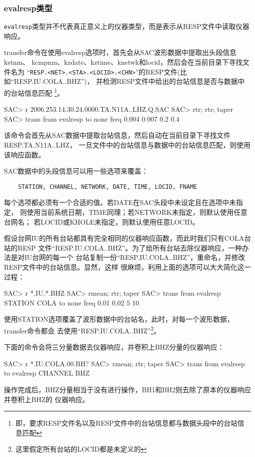 \subsubsection{evalresp类型}
\verb+evalresp+类型并不代表真正意义上的仪器类型，而是表示从RESP文件中读取仪器
响应。

transfer命令在使用evalresp选项时，首先会从SAC波形数据中提取出头段信息kstnm、
kcmpnm、kzdate、kztime、knetwk和locid，然后会在当前目录下寻找文件名为
``\verb+RESP.<NET>.<STA>.<LOCID>.<CHN>+''的RESP文件(比如``RESP.IU.COLA..BHZ'')，
并检测RESP文件中给出的台站信息是否与数据中的台站信息匹配
\footnote{即，要求RESP文件名以及RESP文件中的台站信息都与数据头段中的台站信息匹配}。
\begin{SACCode}
SAC> r 2006.253.14.30.24.0000.TA.N11A..LHZ.Q.SAC
SAC> rtr; rtr; taper
SAC> trans from evalresp to none freq 0.004 0.007 0.2 0.4
\end{SACCode}
该命令会首先从SAC数据中提取台站信息，然后自动在当前目录下寻找文件RESP.TA.N11A..LHZ，
一旦文件中的台站信息与数据中的台站信息匹配，则使用该响应函数。

SAC数据中的头段信息可以用一些选项来覆盖：
\begin{verbatim}
    STATION, CHANNEL, NETWORK, DATE, TIME, LOCID, FNAME
\end{verbatim}
每个选项都必须有一个合适的值。若DATE在SAC头段中未设定且在选项中未指定，
则使用当前系统日期，TIME同理；若NETWORK未指定，则默认使用任意台网名；
若LOCID或KHOLE未指定，则默认使用任意LOCID。

假设台网IU的所有台站都具有完全相同的仪器响应函数，而此时我们只有COLA台站的RESP
文件``RESP.IU.COLA..BHZ''。为了给所有台站去除仪器响应，一种办法是对IU台网的每一个
台站复制一份``RESP.IU.COLA..BHZ''，重命名，并修改RESP文件中的台站信息。显然，这样
很麻烦，利用上面的选项可以大大简化这一过程：
\begin{SACCode}
SAC> r *.IU.*.BHZ
SAC> rmean; rtr; taper
SAC> trans from evalresp STATION COLA to none freq 0.01 0.02 5 10
\end{SACCode}
使用STATION选项覆盖了波形数据中的台站名，此时，对每一个波形数据，transfer命令都会
去使用``RESP.IU.COLA..BHZ''\footnote{这里假定所有台站的LOCID都是未定义的}。

下面的命令会将三分量数据去仪器响应，并卷积上BHZ分量的仪器响应：
\begin{SACCode}
SAC> r *.IU.COLA.00.BH?
SAC> rmean; rtr; taper
SAC> trans from evalresp to evalresp CHANNEL BHZ
\end{SACCode}
操作完成后，BHZ分量相当于没有进行操作，BH1和BH2则去除了原本的仪器响应并卷积上BHZ的
仪器响应。

